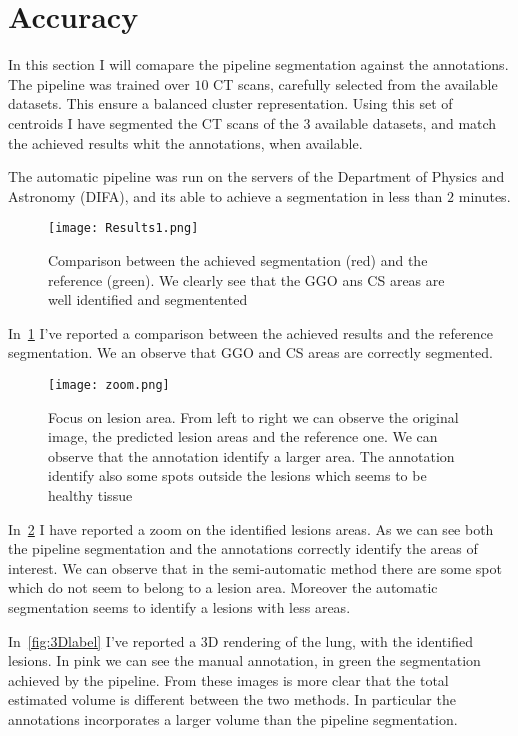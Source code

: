 \documentclass{standalone}
\begin{document}
	
	\section{Accuracy}
	
	
	In this section I will comapare the pipeline segmentation against the annotations. 
	The pipeline was trained over $10$ CT scans, carefully selected from the available datasets. This ensure a balanced cluster representation. 
	Using this set of centroids I have segmented the CT scans of the $3$ available datasets, and match the  achieved results whit the annotations, when available.
	
	The automatic pipeline was run on the servers of the Department of Physics and Astronomy (DIFA), and its able to achieve a segmentation in less than $2$ minutes. 
	
	\begin{figure}[h!]
		\centering 
			\texttt{[image: Results1.png]}
			\caption{Comparison between the achieved segmentation (red) and the reference (green). We clearly see that the GGO ans CS areas are well identified and segmentented}\label{fig:Results}
	\end{figure}

	In \figurename\,\ref{fig:Results} I've reported a comparison between the achieved results and the reference segmentation. We an observe that GGO and CS areas are correctly segmented. 
	
	\begin{figure}[h!]
		\centering
			\texttt{[image: zoom.png]}
			\caption{Focus on lesion area. From left to right we can observe the original image, the predicted lesion areas and the reference one. We can observe that the annotation  identify a larger area. The annotation identify also some spots outside the lesions which seems to be healthy tissue}\label{fig:zoom}
	\end{figure}
	
	
	In \figurename\,\ref{fig:zoom} I have reported a zoom on the identified lesions areas. As we can see both the pipeline segmentation and the annotations correctly identify the areas of interest. We can observe that in the semi-automatic method there are some spot which do not seem to belong to a lesion area. Moreover the automatic segmentation seems to identify a lesions with less areas.
	
	
	In \figurename\,\ref{fig:3Dlabel} I've reported a 3D rendering of the lung, with the identified lesions. In pink we can see the manual annotation, in green the segmentation achieved by the pipeline. From these images is more clear that the total estimated volume is different between the two methods. In particular the annotations incorporates a larger volume than the pipeline segmentation.
	
\end{document}
